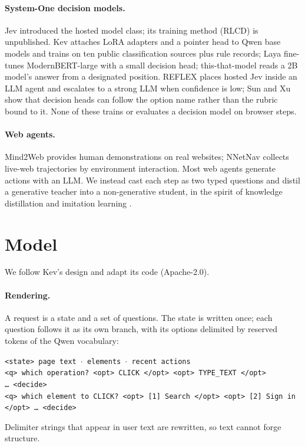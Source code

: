 \documentclass[11pt]{article}
\begin{document}
\paragraph{System-One decision models.} Jev \citep{jev} introduced the hosted model class; its training method (RLCD)
is unpublished. Kev \citep{kev} attaches LoRA adapters and a pointer head to Qwen base models and trains on ten public
classification sources plus rule records; Laya \citep{laya} fine-tunes ModernBERT-large \citep{modernbert} with a
small decision head; this-that-model \citep{thisthat} reads a 2B model's answer from a designated position. REFLEX
\citep{reflex} places hosted Jev inside an LLM agent and escalates to a strong LLM when confidence is low; Sun and Xu
\citep{typesafe} show that decision heads can follow the option name rather than the rubric bound to it. None of these
trains or evaluates a decision model on browser steps.

\paragraph{Web agents.} Mind2Web \citep{mind2web} provides human demonstrations on real websites; NNetNav
\citep{nnetnav} collects live-web trajectories by environment interaction. Most web agents generate actions with an
LLM. We instead cast each step as two typed questions and distil a generative teacher into a non-generative student,
in the spirit of knowledge distillation \citep{hinton2015} and imitation learning \citep{dagger}.

\section{Model}
\label{sec:model}

We follow Kev's design \citep{kev} and adapt its code (Apache-2.0).

\paragraph{Rendering.} A request is a state and a set of questions. The state is written once; each question follows
it as its own branch, with its options delimited by reserved tokens of the Qwen vocabulary:
\begin{center}\small
\texttt{<state> page text $\cdot$ elements $\cdot$ recent actions}\\
\texttt{<q> which operation? <opt> CLICK </opt> <opt> TYPE\_TEXT </opt> \ldots\ <decide>}\\
\texttt{<q> which element to CLICK? <opt> [1] Search </opt> <opt> [2] Sign in </opt> \ldots\ <decide>}
\end{center}
Delimiter strings that appear in user text are rewritten, so text cannot forge structure.
\end{document}
